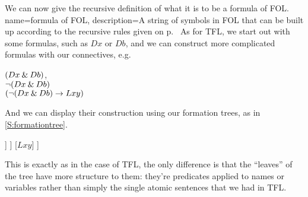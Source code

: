 We can now give the recursive definition of what it is to be a formula of FOL.
	{
	name=formula of FOL,
	description={A string of symbols in FOL that can be built up according to the recursive rules given on p.~\pageref{FOLformula}}
	}
	As for TFL, we start out with some formulas, such as $Dx$ or $Db$, and we can construct more complicated formulas with our connectives, e.g. \begin{center}
	$(Dx\eand Db)$, \\
	$\enot (Dx\eand Db)$\\
	$(\enot(Dx\eand Db)\eif Lxy)$
	\end{center}And we can display their construction using our formation trees, as in 	\ref{S:formationtree}.
		\begin{center}
		\begin{forest}
			[$(\enot(Dx\eand Db)\eif Lxy)$
				[$\enot (Dx\eand Db)$
					[$(Dx\eand Db)$
						[$Dx$]
						[$Db$]
					]
				]
				[$Lxy$]
			]
		\end{forest}
		\end{center}This is exactly as in the case of TFL, the only difference is that the ``leaves'' of the tree have more structure to them: they're predicates applied to names or variables rather than simply the single atomic sentences that we had in TFL.


